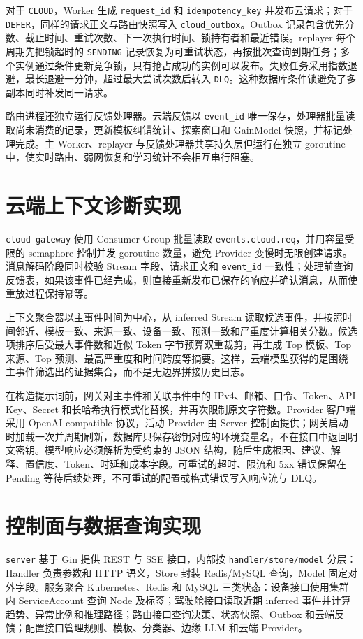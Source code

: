 对于 \texttt{CLOUD}，Worker 生成 \texttt{request\_id} 和 \texttt{idempotency\_key} 并发布云请求；对于 \texttt{DEFER}，同样的请求正文与路由快照写入 \texttt{cloud\_outbox}。Outbox 记录包含优先分数、截止时间、重试次数、下一次执行时间、锁持有者和最近错误。replayer 每个周期先把锁超时的 \texttt{SENDING} 记录恢复为可重试状态，再按批次查询到期任务；多个实例通过条件更新竞争锁，只有抢占成功的实例可以发布。失败任务采用指数退避，最长退避一分钟，超过最大尝试次数后转入 \texttt{DLQ}。这种数据库条件锁避免了多副本同时补发同一请求。

路由进程还独立运行反馈处理器。云端反馈以 \texttt{event\_id} 唯一保存，处理器批量读取尚未消费的记录，更新模板纠错统计、探索窗口和 GainModel 快照，并标记处理完成。主 Worker、replayer 与反馈处理器共享持久层但运行在独立 goroutine 中，使实时路由、弱网恢复和学习统计不会相互串行阻塞。

\section{云端上下文诊断实现}
\texttt{cloud-gateway} 使用 Consumer Group 批量读取 \texttt{events.cloud.req}，并用容量受限的 semaphore 控制并发 goroutine 数量，避免 Provider 变慢时无限创建请求。消息解码阶段同时校验 Stream 字段、请求正文和 \texttt{event\_id} 一致性；处理前查询反馈表，如果该事件已经完成，则直接重新发布已保存的响应并确认消息，从而使重放过程保持幂等。

上下文聚合器以主事件时间为中心，从 inferred Stream 读取候选事件，并按照时间邻近、模板一致、来源一致、设备一致、预测一致和严重度计算相关分数。候选项排序后受最大事件数和近似 Token 字节预算双重裁剪，再生成 Top 模板、Top 来源、Top 预测、最高严重度和时间跨度等摘要。这样，云端模型获得的是围绕主事件筛选出的证据集合，而不是无边界拼接历史日志。

在构造提示词前，网关对主事件和关联事件中的 IPv4、邮箱、口令、Token、API Key、Secret 和长哈希执行模式化替换，并再次限制原文字符数。Provider 客户端采用 OpenAI-compatible 协议，活动 Provider 由 Server 控制面提供；网关启动时加载一次并周期刷新，数据库只保存密钥对应的环境变量名，不在接口中返回明文密钥。模型响应必须解析为受约束的 JSON 结构，随后生成根因、建议、解释、置信度、Token、时延和成本字段。可重试的超时、限流和 5xx 错误保留在 Pending 等待后续处理，不可重试的配置或格式错误写入响应流与 DLQ。

\section{控制面与数据查询实现}
\texttt{server} 基于 Gin 提供 REST 与 SSE 接口，内部按 \texttt{handler/store/model} 分层：Handler 负责参数和 HTTP 语义，Store 封装 Redis/MySQL 查询，Model 固定对外字段。服务聚合 Kubernetes、Redis 和 MySQL 三类状态：设备接口使用集群内 ServiceAccount 查询 Node 及标签；驾驶舱接口读取近期 inferred 事件并计算趋势、异常比例和推理路径；路由接口查询决策、状态快照、Outbox 和云端反馈；配置接口管理规则、模板、分类器、边缘 LLM 和云端 Provider。

